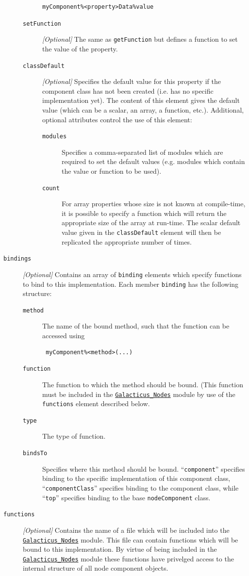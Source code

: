 \begin{description}
\begin{description}
\begin{verbatim}
myComponent%<property>Data%value
\end{verbatim}
\item [{\tt setFunction}] \emph{[Optional]} The same as {\tt getFunction} but defines a function to set the value of the property.
\item [{\tt classDefault}] \emph{[Optional]} Specifies the default value for this property if the component class has not been created (i.e. has no specific implementation yet). The content of this element gives the default value (which can be a scalar, an array, a function, etc.). Additional, optional attributes control the use of this element:
\begin{description}
 \item [{\tt modules}] Specifies a comma-separated list of modules which are required to set the default values (e.g. modules which contain the value or function to be used).
 \item [{\tt count}] For array properties whose size is not known at compile-time, it is possible to specify a function which will return the appropriate size of the array at run-time. The scalar default value given in the {\tt classDefault} element will then be replicated the appropriate number of times.
\end{description}
\end{description}
\item [{\tt bindings}] \emph{[Optional]} Contains an array of {\tt binding} elements which specify functions to bind to this implementation. Each member {\tt binding} has the following structure:
\begin{description}
\item [{\tt method}] The name of the bound method, such that the function can be accessed using
\begin{verbatim}
 myComponent%<method>(...)
\end{verbatim}
\item [{\tt function}] The function to which the method should be bound. (This function must be included in the \hyperlink{objects.nodes.F90:galacticus_nodes}{\tt Galacticus\_Nodes} module by use of the {\tt functions} element described below.
\item [{\tt type}] The type of function.
\item [{\tt bindsTo}] Specifies where this method should be bound. ``{\tt component}'' specifies binding to the specific implementation of this component class, ``{\tt componentClass}'' specifies binding to the component class, while ``{\tt top}'' specifies binding to the base {\tt nodeComponent} class.
\end{description}
\item [{\tt functions}] \emph{[Optional]} Contains the name of a file which will be included into the \hyperlink{objects.nodes.F90:galacticus_nodes}{\tt Galacticus\_Nodes} module. This file can contain functions which will be bound to this implementation. By virtue of being included in the \hyperlink{objects.nodes.F90:galacticus_nodes}{\tt Galacticus\_Nodes} module these functions have privelged access to the internal structure of all node component objects.
\end{description}


